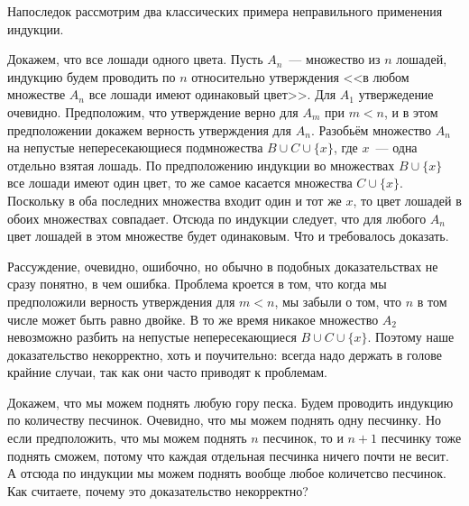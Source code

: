Напоследок рассмотрим два классических примера неправильного применения индукции.

\begin{example}
Докажем, что все лошади одного цвета. Пусть $A_n$~--- множество из $n$ лошадей, индукцию будем проводить по $n$ относительно утверждения <<в любом множестве $A_n$ все лошади имеют одинаковый цвет>>. Для $A_1$ утвержедение очевидно. Предположим, что утверждение верно для $A_m$ при $m<n$, и в этом предположении докажем верность утверждения для $A_n$. Разобьём множество $A_n$ на непустые непересекающиеся подмножества $B\cup C \cup\{x\}$, где $x$~--- одна отдельно взятая лошадь. По предположению индукции во множествах $B\cup\{x\}$ все лошади имеют один цвет, то же самое касается множества $C\cup\{x\}$. Поскольку в оба последних множества входит один и тот же $x$, то цвет лошадей в обоих множествах совпадает. Отсюда по индукции следует, что для любого $A_n$ цвет лошадей в этом множестве будет одинаковым. Что и требовалось доказать.
\end{example}

Рассуждение, очевидно, ошибочно, но обычно в подобных доказательствах не сразу понятно, в чем ошибка. Проблема кроется в том, что когда мы предположили верность утверждения для $m<n$, мы забыли о том, что $n$ в том числе может быть равно двойке. В то же время никакое множество $A_2$ невозможно разбить на непустые непересекающиеся $B\cup C\cup\{x\}$. Поэтому наше доказательство некорректно, хоть и поучительно: всегда надо держать в голове крайние случаи, так как они часто приводят к проблемам.

\begin{exercise}
Докажем, что мы можем поднять любую гору песка. Будем проводить индукцию по количеству песчинок. Очевидно, что мы можем поднять одну песчинку. Но если предположить, что мы можем поднять $n$ песчинок, то и $n+1$ песчинку тоже поднять сможем, потому что каждая отдельная песчинка ничего почти не весит. А отсюда по индукции мы можем поднять вообще любое количетсво песчинок. Как считаете, почему это доказательство некорректно?
\end{exercise}
